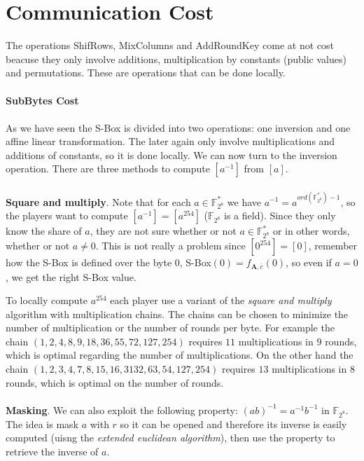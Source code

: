 \documentclass[11pt]{article}
\begin{document}
\section*{Communication Cost}
The operations ShifRows, MixColumns and AddRoundKey come at not cost beacuse they only involve additions, multiplication by constants (public values) and permutations. These are operations that can be done locally.
\\ \\
\textbf{SubBytes Cost} 
\\ \\
As we have seen the S-Box is divided into two operations: one inversion and one affine linear transformation. The later again only involve multiplications and additions of constants, so it is done locally. We can now turn to the inversion operation. There are three methods to compute $[a^{-1}]$ from $[a]$. 
\\ \\
 \textbf{Square and multiply}. Note that for each $a \in \mathbb{F}_{2^8}^*$ we have $a^{-1} = a^{ord(\mathbb{F}_{2^8}^*)-1}$, so the players want to compute $[a^{-1}] = [a^{254}]$ ($\mathbb{F}_{2^8}$ is a field). Since they only know the share of $a$, they are not sure whether or not $a \in \mathbb{F}_{2^8}^*$ or in other words, whether or not $a \neq 0$. This is not really a problem since $[0^{254}] = [0]$, remember how the S-Box is defined over the byte $0$, S-Box$(0) = f_{\mathbf{A}, \overline{c}}(0)$, so even if $a=0$, we get the right S-Box value.

 To locally compute $a^{254}$ each player use a variant of the \emph{square and multiply} algorithm with multiplication chains. The chains can be chosen to minimize the number of multiplication or the number of rounds per byte. For example the chain $(1,2,4,8,9,18,36,55,72,127,254)$ requires $11$ multiplications in $9$ rounds, which is optimal regarding the number of multiplications. On the other hand the chain $(1,2,3,4,7,8,15,16,3132,63,54,127,254)$ requires $13$ multiplications in $8$ rounds, which is optimal on the number of rounds.
\\ \\
\textbf{Masking}. We can also exploit the following property: $(ab)^{-1} = a^{-1}b^{-1}$ in $\mathbb{F}_{2^8}$. The idea is mask $a$ with $r$ so it can be opened and therefore its inverse is easily computed (uisng the \emph{extended euclidean algorithm}), then use the property to retrieve the inverse of $a$. 
\end{document}
